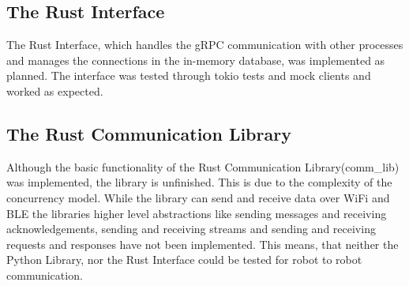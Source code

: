 \subsection{The Rust Interface}
The Rust Interface, which handles the gRPC communication with other processes and manages the connections in the in-memory database, was implemented as planned. The interface was tested through tokio tests and mock clients and worked as expected.

\subsection{The Rust Communication Library}
Although the basic functionality of the Rust Communication Library(comm\_lib) was implemented, the library is unfinished. This is due to the complexity of the concurrency model. While the library can send and receive data over WiFi and
BLE the libraries higher level abstractions like sending messages and receiving acknowledgements, sending and receiving streams and sending and receiving requests and responses have not been implemented. This means, that neither the
Python Library, nor the Rust Interface could be tested for robot to robot communication.

